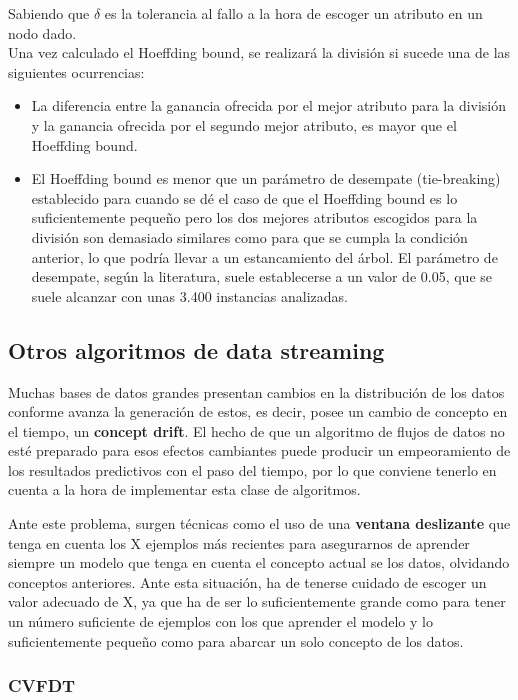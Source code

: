 Sabiendo que $\delta$ es la tolerancia al fallo a la hora de escoger un atributo en un nodo dado.\\
Una vez calculado el Hoeffding bound, se realizará la división si sucede una de las siguientes ocurrencias:
\begin{itemize}
	\item La diferencia entre la ganancia ofrecida por el mejor atributo para la división y la ganancia ofrecida por el segundo mejor atributo, es mayor que el Hoeffding bound.
	\item El Hoeffding bound es menor que un parámetro de desempate (tie-breaking) establecido para cuando se dé el caso de que el Hoeffding bound es lo suficientemente pequeño pero los dos mejores atributos escogidos para la división son demasiado similares como para que se cumpla la condición anterior, lo que podría llevar a un estancamiento del árbol. El parámetro de desempate, según la literatura, suele establecerse a un valor de 0.05, que se suele alcanzar con unas 3.400 instancias analizadas.
\end{itemize}

\subsection{Otros algoritmos de data streaming}

Muchas bases de datos grandes presentan cambios en la distribución de los datos conforme avanza la generación de estos, es decir, posee un cambio de concepto en el tiempo, un \textbf{concept drift}. El hecho de que un algoritmo de flujos de datos no esté preparado para esos efectos cambiantes puede producir un empeoramiento de los resultados predictivos con el paso del tiempo, por lo que conviene tenerlo en cuenta a la hora de implementar esta clase de algoritmos.

Ante este problema, surgen técnicas como el uso de una \textbf{ventana deslizante} que tenga en cuenta los X ejemplos más recientes para asegurarnos de aprender siempre un modelo que tenga en cuenta el concepto actual se los datos, olvidando conceptos anteriores. Ante esta situación, ha de tenerse cuidado de escoger un valor adecuado de X, ya que ha de ser lo suficientemente grande como para tener un número suficiente de ejemplos con los que aprender el modelo y lo suficientemente pequeño como para abarcar un solo concepto de los datos.

\subsubsection{CVFDT}


